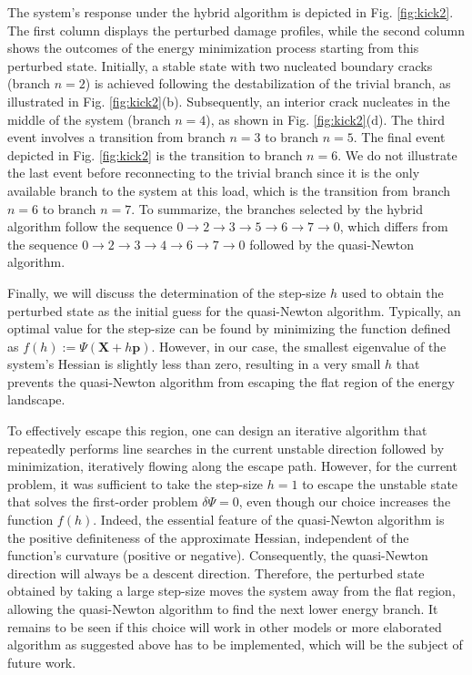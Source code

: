 The system's response under the hybrid algorithm is depicted in Fig. \ref{fig:kick2}. The first column displays the perturbed damage profiles, while the second column shows the outcomes of the energy minimization process starting from  this perturbed state. Initially, a stable state with two nucleated boundary cracks (branch \( n=2 \)) is achieved following the destabilization of the trivial branch, as illustrated in Fig. \ref{fig:kick2}(b). Subsequently, an interior crack nucleates in the middle of the system (branch \( n=4 \)), as shown in Fig. \ref{fig:kick2}(d). The third event involves a transition from branch \( n=3 \) to branch \( n=5 \). The final event depicted in Fig. \ref{fig:kick2} is the transition to branch \( n=6 \). We do not illustrate the last  event before reconnecting to the trivial branch since it is the only available branch to the system at this load, which is the transition from branch \( n=6 \) to branch \( n=7 \). To summarize, the branches selected by the hybrid algorithm follow the sequence 
\( 0 \rightarrow 2 \rightarrow 3 \rightarrow 5 \rightarrow 6 \rightarrow 7 \rightarrow 0 \), 
which differs from the sequence 
\( 0 \rightarrow 2 \rightarrow 3 \rightarrow 4 \rightarrow 6 \rightarrow 7 \rightarrow 0 \) 
followed by the quasi-Newton algorithm.

Finally, we will discuss the determination of the step-size \( h \) used to obtain the perturbed state as the initial guess for the quasi-Newton algorithm.
Typically, an optimal value for the step-size can be found by minimizing the function defined as \( f(h) := \Psi(\mathbf{X} + h \mathbf{p}) \). However, in our case, the smallest eigenvalue of the system's Hessian is slightly less than zero, resulting in a very small \( h \) that prevents the quasi-Newton algorithm from escaping the flat region of the energy landscape.

To effectively escape this region, one can design an iterative algorithm that repeatedly performs line searches in the current unstable direction followed by minimization, iteratively flowing along the escape path. However, for the current problem, it was sufficient to take the step-size \( h=1 \) to escape the unstable state that solves the first-order problem \( \delta \Psi=0 \), even though our choice increases the function \( f(h) \). Indeed, the essential feature of the quasi-Newton algorithm is the positive definiteness of the approximate Hessian, independent of the function's curvature (positive or negative). Consequently, the quasi-Newton direction will always be a descent direction. Therefore, the perturbed state obtained by taking a large step-size moves the system away from the flat region, allowing the quasi-Newton algorithm to find the next lower energy branch. It remains to be seen if this choice will work in other models or more elaborated algorithm as suggested above has to be implemented, which will be the subject of future work.

